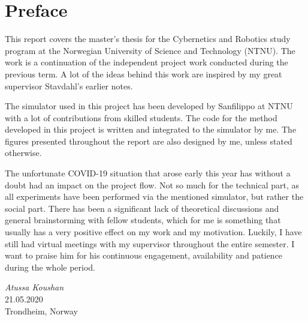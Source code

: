\chapter{Preface}

This report covers the master's thesis for the Cybernetics and Robotics study program at the Norwegian University of Science and Technology (NTNU). The work is a continuation of the independent project work conducted during the previous term. A lot of the ideas behind this work are inspired by my great supervisor Stavdahl's earlier notes.

The simulator used in this project has been developed by Sanfilippo at NTNU with a lot of contributions from skilled students. The code for the method developed in this project is written and integrated to the simulator by me. The figures presented throughout the report are also designed by me, unless stated otherwise.

The unfortunate COVID-19 situation that arose early this year has without a doubt had an impact on the project flow. Not so much for the technical part, as all experiments have been performed via the mentioned simulator, but rather the social part. There has been a significant lack of theoretical discussions and general brainstorming with fellow students, which for me is something that usually has a very positive effect on my work and my motivation. Luckily, I have still had virtual meetings with my supervisor throughout the entire semester.
I want to praise him for his continuous engagement, availability and patience during the whole period.


\medskip
\begin {flushright}
  \textit{Atussa Koushan} \\
  \textsc {21.05.2020} \\
  Trondheim, Norway
\end {flushright}



\makeatletter
{}


\makeatother




